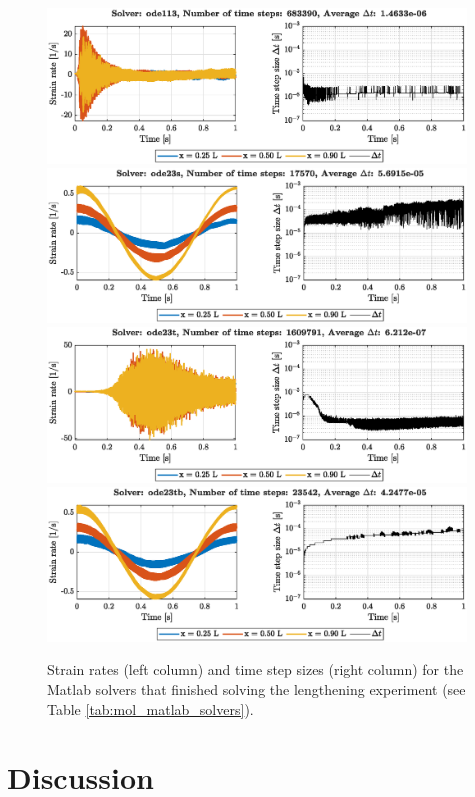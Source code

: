 \documentclass{sfuthesis}
\numberwithin{equation}{section}
\numberwithin{figure}{chapter}
\numberwithin{table}{chapter}
\theoremstyle{definition}
\begin{document}
\begin{figure}
    \centering
    \includegraphics[width=0.99\textwidth]{nh_ode113.eps}
    \includegraphics[width=0.99\textwidth]{nh_ode23s.eps}
    \includegraphics[width=0.99\textwidth]{nh_ode23t.eps}
    \includegraphics[width=0.99\textwidth]{nh_ode23tb.eps}
    \caption{Strain rates (left column) and time step sizes (right column) for the Matlab solvers that finished solving the lengthening experiment (see Table \ref{tab:mol_matlab_solvers}).
    \label{fig:sin_pull_matlab}}
\end{figure}

\section{Discussion}
\end{document}
